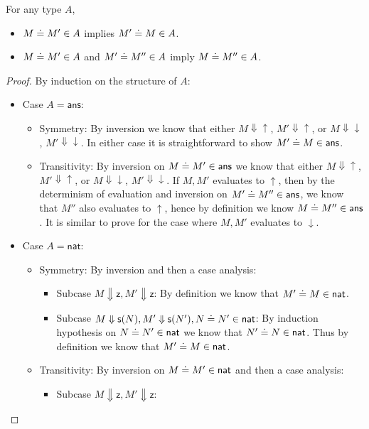 \documentclass{article}
\newcommand{\tans}{\mathsf{ans}}
\newcommand{\tnat}{\mathsf{nat}}
\newcommand{\eacc}{\uparrow}
\newcommand{\erej}{\downarrow}
\newcommand{\ez}{\mathsf{z}}
\newcommand{\es}[1]{\mathsf{s}(#1)}
\newcommand{\evalto}{\Downarrow}
\begin{document}
\begin{lemma}
For any type $A$,
\begin{itemize}
    \item $M \doteq M' \in A$ implies $M' \doteq M \in A$.
    \item $M \doteq M' \in A$ and $M' \doteq M'' \in A$ imply $M \doteq M'' \in A$.
\end{itemize}
\end{lemma}
\begin{proof}
By induction on the structure of $A$:
\begin{itemize}
    \item Case $A = \tans$:
    \begin{itemize}
        \item Symmetry:
        By inversion we know that either $M \evalto {\eacc}$, $M' \evalto {\eacc}$, or $M \evalto {\erej}$, $M' \evalto {\erej}$.
        In either case it is straightforward to show $M' \eeq M \in \tans$.
        \item Transitivity:
        By inversion on $M \eeq M' \in \tans$ we know that either $M \evalto {\eacc}$, $M' \evalto {\eacc}$, or $M \evalto {\erej}$, $M' \evalto {\erej}$.
        If $M,M'$ evaluates to $\eacc$, then by the determinism of evaluation and inversion on $M' \eeq M'' \in \tans$, we know that $M''$ also evaluates to $\eacc$, hence by definition we know $M \eeq M'' \in \tans$.
        It is similar to prove for the case where $M,M'$ evaluates to $\erej$.
    \end{itemize}
    \item Case $A = \tnat$:
    \begin{itemize}
        \item Symmetry:
        By inversion and then a case analysis:
        \begin{itemize}
            \item Subcase $M \evalto \ez,M' \evalto \ez$:
            By definition we know that $M' \eeq M \in \tnat$.
            \item Subcase $M \evalto \es{N},M' \evalto \es{N'},N \eeq N' \in \tnat$:
            By induction hypothesis on $N \eeq N' \in \tnat$ we know that $N' \eeq N \in \tnat$.
            Thus by definition we know that $M' \eeq M \in \tnat$.
        \end{itemize}
        \item Transitivity:
        By inversion on $M \eeq M' \in \tnat$ and then a case analysis:
        \begin{itemize}
            \item Subcase $M \evalto \ez, M' \evalto \ez$:

\end{itemize}
\end{itemize}
\end{itemize}
\end{proof}
\end{document}
